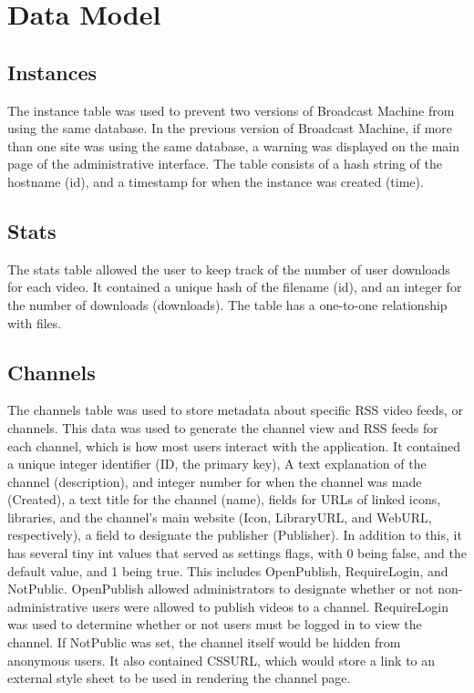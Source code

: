\documentclass[a4paper,12pt]{report}
\begin{document}
\section{Data Model}


\subsection{Instances}
The instance table was used to prevent two versions of Broadcast Machine from using the same database. In the previous version of Broadcast Machine, if more than one site was using the same database, a warning was displayed on the main page of the administrative interface. The table consists of a hash string of the hostname (id), and a timestamp for when the instance was created (time). 


\subsection{Stats}
The stats table allowed the user to keep track of the number of user downloads for each video. It contained a unique hash of the filename (id), and an integer for the number of downloads (downloads). The table has a one-to-one relationship with files.


\subsection{Channels}
The channels table was used to store metadata about specific RSS video feeds, or channels. This data was used to generate the channel view and RSS feeds for each channel, which is how most users interact with the application. 
It contained a unique integer identifier (ID, the primary key), A text explanation of the channel (description), and integer number for when the channel was made (Created), a text title for the channel (name), fields for URLs of linked icons, libraries, and the channel's main website (Icon, LibraryURL, and WebURL, respectively), a field to designate the publisher (Publisher). In addition to this, it has several tiny int values that served as settings flags, with 0 being false, and the default value, and 1 being true. This includes OpenPublish, RequireLogin, and NotPublic. OpenPublish allowed administrators to designate whether or not non-administrative users were allowed to publish videos to a channel. RequireLogin was used to determine whether or not users must be logged in to view the channel. If NotPublic was set, the channel itself would be hidden from anonymous users.
It also contained CSSURL, which would store a link to an external style sheet to be used in rendering the channel page.
\end{document}
